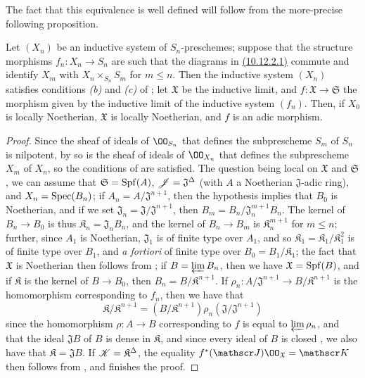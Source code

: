The fact that this equivalence is well defined will follow from the more-precise following proposition.

\begin{prop}[10.12.3.1]
\label{1.10.12.3.1}
Let $(X_n)$ be an inductive system of $S_n$-preschemes;
suppose that the structure morphisms $f_n:X_n\to S_n$ are such that the diagrams in \hyperref[1.10.12.2]{(10.12.2.1)} commute and identify $X_m$ with $X_n\times_{S_n}S_m$ for $m\leq n$.
Then the inductive system $(X_n)$ satisfies conditions \emph{(b)} and \emph{(c)} of ;
let $\mathfrak{X}$ be the inductive limit, and $f:\mathfrak{X}\to\mathfrak{S}$ the morphism given by the inductive limit of the inductive system $(f_n)$.
Then, if $X_0$ is locally Noetherian, $\mathfrak{X}$ is locally Noetherian, and $f$ is an adic morphism.
\end{prop}

\begin{proof}
\label{proof-1.10.12.3.1}
Since the sheaf of ideals of $\OO_{S_n}$ that defines the subprescheme $S_m$ of $S_n$ is nilpotent, by  so is the sheaf of ideals of $\OO_{X_n}$ that defines the subprescheme $X_m$ of $X_n$, so the conditions of  are satisfied.
The question being local on $\mathfrak{X}$ and $\mathfrak{S}$, we can assume that $\mathfrak{S}=\operatorname{Spf}(A)$, $\mathscr{J}=\mathfrak{J}^\Delta$ (with $A$ a Noetherian $\mathfrak{J}$-adic ring), and $X_n=\operatorname{Spec}(B_n)$;
if $A_n=A/\mathfrak{J}^{n+1}$, then the hypothesis implies that $B_0$ is Noetherian, and if we set $\mathfrak{J}_n=\mathfrak{J}/\mathfrak{J}^{n+1}$, then $B_m=B_n/\mathfrak{J}_n^{m+1}B_n$.
The kernel of $B_n\to B_0$ is thus $\mathfrak{K}_n=\mathfrak{J}_nB_n$, and the kernel of $B_n\to B_m$ is $\mathfrak{K}_n^{m+1}$ for $m\leq n$;
further, since $A_1$ is Noetherian, $\mathfrak{J}_1$ is of finite type over $A_1$, and so $\mathfrak{K}_1=\mathfrak{K}_1/\mathfrak{K}_1^2$ is of finite type over $B_1$, and \emph{a fortiori} of finite type over $B_0=B_1/\mathfrak{K}_1$;
the fact that $\mathfrak{X}$ is Noetherian then follows from ;
if $B=\varprojlim B_n$, then we have $\mathfrak{X}=\operatorname{Spf}(B)$, and if $\mathfrak{K}$ is the kernel of $B\to B_0$, then $B_n=B/\mathfrak{K}^{n+1}$.
If $\rho_n:A/\mathfrak{J}^{n+1}\to B/\mathfrak{K}^{n+1}$ is the homomorphism corresponding to $f_n$, then we have that
\[
    \mathfrak{K}/\mathfrak{K}^{n+1} = (B/\mathfrak{K}^{n+1})\rho_n(\mathfrak{J}/\mathfrak{J}^{n+1})
\]
since the homomorphism $\rho:A\to B$ corresponding to $f$ is equal to $\varprojlim\rho_n$, and that the ideal $\mathfrak{J}B$ of $B$ is dense in $\mathfrak{K}$, and since every ideal of $B$ is closed , we also have that $\mathfrak{K}=\mathfrak{J}B$.
If $\mathscr{K}=\mathfrak{K}^\Delta$, the equality $f^*(\sh{J})\OO_\mathfrak{X}=\sh{K}$ then follows from , and finishes the proof.
\end{proof}

